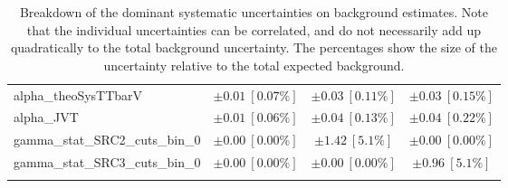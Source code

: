 \begin{table}
\begin{center}
\begin{tabular*}{\textwidth}{@{\extracolsep{\fill}}lccc}
alpha\_theoSysTTbarV         & $\pm 0.01\ [0.07\%] $          & $\pm 0.03\ [0.11\%] $          & $\pm 0.03\ [0.15\%] $       \\
alpha\_JVT         & $\pm 0.01\ [0.06\%] $          & $\pm 0.04\ [0.13\%] $          & $\pm 0.04\ [0.22\%] $       \\
gamma\_stat\_SRC2\_cuts\_bin\_0         & $\pm 0.00\ [0.00\%] $          & $\pm 1.42\ [5.1\%] $          & $\pm 0.00\ [0.00\%] $       \\
gamma\_stat\_SRC3\_cuts\_bin\_0         & $\pm 0.00\ [0.00\%] $          & $\pm 0.00\ [0.00\%] $          & $\pm 0.96\ [5.1\%] $       \\
\noalign{\smallskip}\hline\noalign{\smallskip}
\end{tabular*}
\end{center}
\caption[Breakdown of uncertainty on background estimates]{
Breakdown of the dominant systematic uncertainties on background estimates.
Note that the individual uncertainties can be correlated, and do not necessarily add up quadratically to 
the total background uncertainty. The percentages show the size of the uncertainty relative to the total expected background.
\label{table.results.bkgestimate.uncertainties.SRC1_SRC2_SRC3}}
\end{table}
%